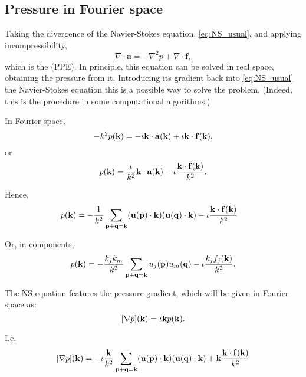 \subsection{Pressure in Fourier space}

Taking the divergence of the Navier-Stokes equation, \eqref{eq:NS_usual}, and applying incompressibility,
\begin{equation}\label{eq:Poisson}
	\nabla\cdot \mathbf{a} = -\nabla^2 p + \nabla\cdot \mathbf{f} ,
\end{equation}
which is the  (PPE).
In principle, this equation can be solved in real space, obtaining the pressure from it. Introducing its gradient back into \eqref{eq:NS_usual} the Navier-Stokes equation this is a possible way to solve the problem. (Indeed, this is the procedure in some computational algorithms.)

In Fourier space,
\[
-k^2 p (\mathbf{k} ) = - \iota \mathbf{k} \cdot \mathbf{a}(\mathbf{k}) + \iota \mathbf{k} \cdot \mathbf{f}(\mathbf{k}) ,
\]
or
\[
p (\mathbf{k} ) =  \frac{\iota}{k^2} \mathbf{k} \cdot \mathbf{a}(\mathbf{k})
- \iota \frac{\mathbf{k} \cdot \mathbf{f}(\mathbf{k})}{k^2}  .
\]


Hence,
\begin{align*}
	p (\mathbf{k} ) & = -\frac{1}{k^2} 
	\sum_{ \mathbf{p} + \mathbf{q} = \mathbf{k}}
	(\mathbf{u}(\mathbf{p} )
	\cdot
	\mathbf{k}
	)
	(
	\mathbf{u}(\mathbf{q} ) \cdot
	\mathbf{k}
	) 
	- \iota
	\frac{\mathbf{k} \cdot \mathbf{f}(\mathbf{k}) }{k^2}     
\end{align*}


Or, in components,
\[
p (\mathbf{k} ) = -\frac{k_j k_m}{k^2}
\sum_{ \mathbf{p} + \mathbf{q} = \mathbf{k}}
u_j(\mathbf{p} )
u_m(\mathbf{q} )
- \iota
\frac{k_j f_j(\mathbf{k}) }{k^2} .
\]


The NS equation features the pressure gradient, which will be given in Fourier space as:
\[
[\nabla p ](\mathbf{k}) = \iota \mathbf{k} p(\mathbf{k}) .
\]

I.e.
\[[\nabla p ](\mathbf{k}) =
-\iota \frac{\mathbf{k} }{k^2} 
\sum_{ \mathbf{p} + \mathbf{q} = \mathbf{k}}
(\mathbf{u}(\mathbf{p} )
\cdot
\mathbf{k}
)
(
\mathbf{u}(\mathbf{q} ) \cdot
\mathbf{k}
) 
+ \mathbf{k}
\frac{\mathbf{k} \cdot \mathbf{f}(\mathbf{k})  }{k^2} 
\]




